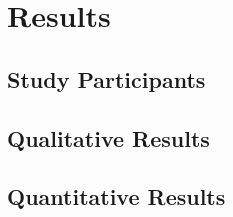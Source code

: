 \section{Results} \label{sec:results}

\subsection{Study Participants} \label{ssec:study_participants}

\subsection{Qualitative Results} \label{ssec:qual_results}

\subsection{Quantitative Results} \label{ssec:quant_results}
